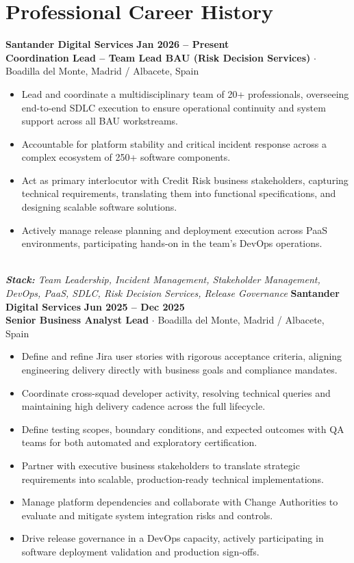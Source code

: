 \documentclass[10pt,a4paper]{article}
\begin{document}
\section{Professional Career History}
\noindent\textbf{\large Santander Digital Services} \hfill {\color{SynthBlue}\textbf{Jan 2026 -- Present}} \\
{\color{SynthPink}\textbf{Coordination Lead -- Team Lead BAU (Risk Decision Services)}} $\cdot$ {\color{SlateGray}Boadilla del Monte, Madrid / Albacete, Spain}
\begin{itemize}[leftmargin=1.5em, itemsep=1.5pt, topsep=2pt]
    \item Lead and coordinate a multidisciplinary team of 20+ professionals, overseeing end-to-end SDLC execution to ensure operational continuity and system support across all BAU workstreams.
    \item Accountable for platform stability and critical incident response across a complex ecosystem of 250+ software components.
    \item Act as primary interlocutor with Credit Risk business stakeholders, capturing technical requirements, translating them into functional specifications, and designing scalable software solutions.
    \item Actively manage release planning and deployment execution across PaaS environments, participating hands-on in the team's DevOps operations.
\end{itemize}
\\\noindent\textit{\footnotesize \textbf{Stack:} Team Leadership, Incident Management, Stakeholder Management, DevOps, PaaS, SDLC, Risk Decision Services, Release Governance}
\vspace{10pt}
\noindent\textbf{\large Santander Digital Services} \hfill {\color{SynthBlue}\textbf{Jun 2025 -- Dec 2025}} \\
{\color{SynthPink}\textbf{Senior Business Analyst Lead}} $\cdot$ {\color{SlateGray}Boadilla del Monte, Madrid / Albacete, Spain}
\begin{itemize}[leftmargin=1.5em, itemsep=1.5pt, topsep=2pt]
    \item Define and refine Jira user stories with rigorous acceptance criteria, aligning engineering delivery directly with business goals and compliance mandates.
    \item Coordinate cross-squad developer activity, resolving technical queries and maintaining high delivery cadence across the full lifecycle.
    \item Define testing scopes, boundary conditions, and expected outcomes with QA teams for both automated and exploratory certification.
    \item Partner with executive business stakeholders to translate strategic requirements into scalable, production-ready technical implementations.
    \item Manage platform dependencies and collaborate with Change Authorities to evaluate and mitigate system integration risks and controls.
    \item Drive release governance in a DevOps capacity, actively participating in software deployment validation and production sign-offs.
\end{itemize}
\end{document}
